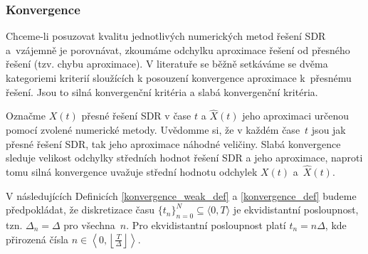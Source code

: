 \documentclass[a4paper,12pt]{report}
\theoremstyle{definition} \newtheorem{definice}[veta]{Definice}
\theoremstyle{remark}
\begin{document}
\subsubsection{Konvergence}
Chceme-li posuzovat kvalitu jednotlivých numerických metod řešení SDR a~vzájemně je porovnávat, zkoumáme odchylku aproximace řešení od přesného řešení (tzv. chybu aproximace).
V literatuře se běžně setkáváme se dvěma kategoriemi kriterií sloužících k posouzení konvergence aproximace k~přesnému řešení.
Jsou to silná konvergenční kritéria a slabá konvergenční kritéria. 

Označme $X(t)$ přesné řešení SDR v čase $t$ a $\hat X(t)$ jeho aproximaci určenou pomocí zvolené numerické metody.
Uvědomme si, že v každém čase~$t$ jsou jak přesné řešení SDR, tak jeho aproximace náhodné veličiny.
Slabá konvergence sleduje velikost odchylky středních hodnot řešení SDR a jeho aproximace, naproti tomu silná konvergence uvažuje střední hodnotu odchylek $X(t)$ a~$\hat X(t)$.

V následujících Definicích \ref{konvergence_weak_def} a \ref{konvergence_def} budeme předpokládat, že diskretizace času $\{t_n\}_{n=0}^N\subseteq \langle0,T\rangle$ je ekvidistantní posloupnost, tzn. $\Delta_n=\Delta$ pro všechna~$n$.
Pro ekvidistantní posloupnost platí $t_n=n\Delta$, kde přirozená čísla $n\in\left\langle0,\left\lfloor\frac{T}{\Delta}\right\rfloor\right\rangle$.
\end{document}

